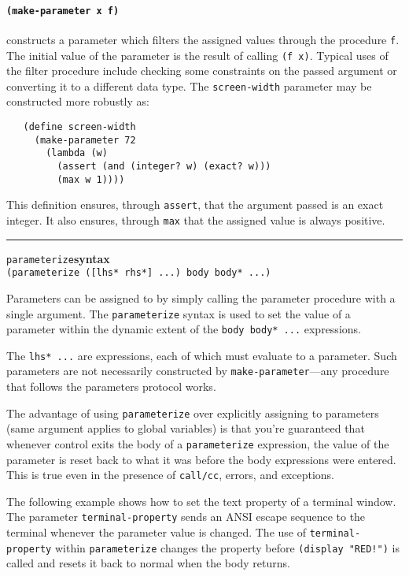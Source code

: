 \documentclass[onecolumn, 12pt, twoside, openright, dvipdfm]{book}
\makeatletter
\newcommand{\idxlabeldefun}[5]{
\vspace{1ex}
\rule{\textwidth}{2pt}
{\phantomsection\index{#1@\texttt{#2}}\label{#3}{\Large\texttt{#4}}\hfill\textbf{#5}}\\}
\newcommand{\idxdefun}[3]{\idxlabeldefun{#1}{#2}{#1}{#2}{#3}}
\newcommand{\defun}[2]{\idxdefun{#1}{#1}{#2}}
\makeatother
\begin{document}
\paragraph{\texttt{(make-parameter x f)}} constructs a parameter
which filters the assigned values through the procedure \texttt{f}.
The initial value of the parameter is the result of calling
\texttt{(f~x)}.  Typical uses of the filter procedure include
checking some constraints on the passed argument or converting it to
a different data type.  The \texttt{screen-width} parameter may be
constructed more robustly as:
\begin{verbatim}
   (define screen-width 
     (make-parameter 72
       (lambda (w)
         (assert (and (integer? w) (exact? w)))
         (max w 1))))
\end{verbatim}
This definition ensures, through \texttt{assert}, that the argument
passed is an exact integer.  It also ensures, through \texttt{max}
that the assigned value is always positive.


\defun{parameterize}{syntax}
\texttt{(parameterize ([lhs* rhs*] ...) body body* ...)}

Parameters can be assigned to by simply calling the parameter
procedure with a single argument.  The \texttt{parameterize} syntax
is used to set the value of a parameter within the dynamic extent of
the \texttt{body~body*~...} expressions.  

The \texttt{lhs* ...} are expressions, each of which must evaluate
to a parameter.  Such parameters are not necessarily constructed by
\texttt{make-parameter}---any procedure that follows the parameters
protocol works.  

The advantage of using \texttt{parameterize} over explicitly
assigning to parameters (same argument applies to global variables)
is that you're guaranteed that whenever control exits the body of a
\texttt{parameterize} expression, the value of the parameter is
reset back to what it was before the body expressions were entered.
This is true even in the presence of \texttt{call/cc}, errors, and
exceptions.

The following example shows how to set the text property of a
terminal window.  The parameter \texttt{terminal-property} sends an
ANSI escape sequence to the terminal whenever the parameter value is
changed.  The use of \texttt{terminal-property} within
\texttt{parameterize} changes the property before
\texttt{(display~"RED!")} is called and resets it back to normal
when the body returns.
\end{document}
